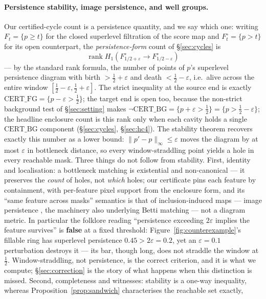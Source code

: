 \documentclass[10pt]{article}
\newcommand{\CFG}{\mathrm{CERT\_FG}}
\newcommand{\CBG}{\mathrm{CERT\_BG}}
\newcommand{\eps}{\varepsilon}
\begin{document}
\paragraph{Persistence stability, image persistence, and well groups.}
Our certified-cycle count is a persistence quantity, and we say which
one: writing $F_t = \{p \ge t\}$ for the closed superlevel filtration of
the score map and $F^{\circ}_t = \{p > t\}$ for its open counterpart, the
\emph{persistence-form} count of \S\ref{sec:cycles} is
\[
  \operatorname{rank} H_1(F^{\circ}_{1/2+\eps} \to F^{\circ}_{1/2-\eps})
\]
--- by the standard rank formula, the number of points of $p$'s superlevel
persistence diagram with birth $> \tfrac12+\eps$ and death
$< \tfrac12-\eps$, i.e.\ alive across the entire window
$[\tfrac12-\eps, \tfrac12+\eps]$. The strict inequality at the source end
is exactly $\CFG = \{p-\eps > \tfrac12\}$; the target end is open too,
because the non-strict background test of \S\ref{sec:setting} makes
$\lnot\CBG = \{p+\eps > \tfrac12\} = \{p > \tfrac12-\eps\}$;
the headline enclosure count is this rank only when each cavity holds a
single $\CBG$ component (\S\ref{sec:cycles}, \S\ref{sec:hc4}). The stability theorem
\citep{cohensteiner2007stability} recovers exactly this number as a lower
bound: $\|p'-p\|_\infty \le \eps$ moves the diagram by at most $\eps$ in
bottleneck distance, so every window-straddling point yields a hole in
every reachable mask. Three things do not follow from stability. First,
identity and localisation: a bottleneck matching is existential and
non-canonical --- it preserves the \emph{count} of holes, not
\emph{which} holes; our certificate pins each feature by containment,
with per-feature pixel support from the enclosure form, and its ``same
feature across masks'' semantics is that of inclusion-induced maps ---
image persistence \citep{cohensteiner2009image}, the machinery also
underlying Betti matching \citep{stucki2023betti} --- not a diagram
metric. In particular the folklore reading ``persistence exceeding
$2\eps$ implies the feature survives'' is \textbf{false} at a fixed
threshold: Figure~\ref{fig:counterexample}'s fillable ring has superlevel
persistence $0.45 > 2\eps = 0.2$, yet an $\eps = 0.1$ perturbation
destroys it --- its bar, though long, does not straddle the window at
$\tfrac12$. Window-straddling, not persistence, is the correct criterion,
and it is what we compute; \S\ref{sec:correction} is the story of what
happens when this distinction is missed. Second, completeness and
witnesses: stability is a one-way inequality, whereas
Proposition~\ref{prop:sandwich} characterises the reachable set exactly,
\end{document}
